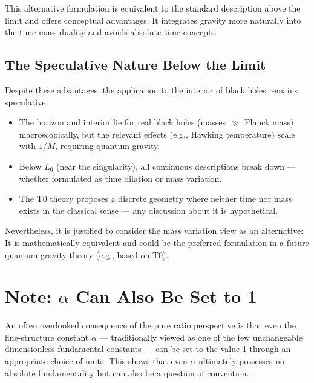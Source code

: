 	This alternative formulation is equivalent to the standard description above the limit and offers conceptual advantages: It integrates gravity more naturally into the time-mass duality and avoids absolute time concepts.
	
	\subsection{The Speculative Nature Below the Limit}
	Despite these advantages, the application to the interior of black holes remains speculative:
	\begin{itemize}
		\item The horizon and interior lie for real black holes (masses $\gg$ Planck mass) macroscopically, but the relevant effects (e.g., Hawking temperature) scale with $1/M$, requiring quantum gravity.
		\item Below $L_0$ (near the singularity), all continuous descriptions break down --- whether formulated as time dilation or mass variation.
		\item The T0 theory proposes a discrete geometry where neither time nor mass exists in the classical sense --- any discussion about it is hypothetical.
	\end{itemize}
	
	Nevertheless, it is justified to consider the mass variation view as an alternative: It is mathematically equivalent and could be the preferred formulation in a future quantum gravity theory (e.g., based on T0).
	
	\section{Note: $\alpha$ Can Also Be Set to 1}
	An often overlooked consequence of the pure ratio perspective is that even the fine-structure constant $\alpha$ --- traditionally viewed as one of the few unchangeable dimensionless fundamental constants --- can be set to the value 1 through an appropriate choice of units. This shows that even $\alpha$ ultimately possesses no absolute fundamentality but can also be a question of convention.
	
